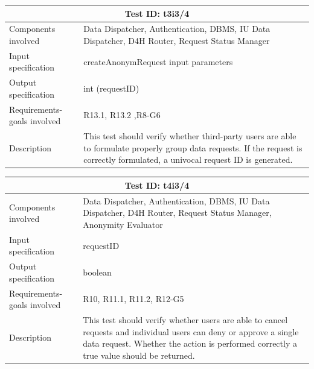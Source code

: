\begin{table}[H]
\centering
\begin{tabular}{ |p{4.5cm}||p{11cm}|  }
 \hline
 \multicolumn{2}{|c|}{Test ID: t3i3/4} \\
 
 \hline 
 Components involved  	&    Data Dispatcher, Authentication, DBMS, IU Data Dispatcher, D4H Router,  Request Status Manager\\
 Input specification  	&  	 createAnonymRequest input parameters\\
Output specification  	& 	  	int (requestID)\\
Requirements-goals involved &    R13.1, R13.2 ,R8-G6\\
Description  	& 	 	   This test should verify whether third-party users are able to formulate properly group data requests. If the request is correctly formulated, a univocal request ID is generated. \\
 \hline
\end{tabular}
\end{table}
\begin{table}[H]
\centering
\begin{tabular}{ |p{4.5cm}||p{11cm}|  }
 \hline
 \multicolumn{2}{|c|}{Test ID: t4i3/4} \\
 
 \hline 
 Components involved  	&    Data Dispatcher, Authentication, DBMS, IU Data Dispatcher, D4H Router,  Request Status Manager, Anonymity Evaluator\\
 Input specification  	&  	 requestID\\
Output specification  	& 	  	boolean\\
Requirements-goals involved &    R10, R11.1, R11.2, R12-G5\\
Description  	& 	 	   This test should verify whether users are able to cancel requests and individual users can deny or approve a single data request. Whether the action is performed correctly a true value should be returned. \\
 \hline
\end{tabular}
\end{table}

